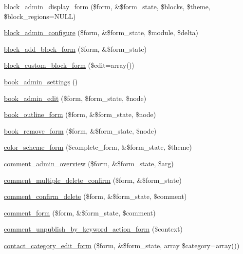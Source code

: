 \begin{DoxyCompactItemize}
\hyperlink{group__forms_ga19dc9d98e83e7e7c9574298100752ba7}{block\_\-admin\_\-display\_\-form} (\$form, \&\$form\_\-state, \$blocks, \$theme, \$block\_\-regions=NULL)
\item 
\hyperlink{group__forms_ga0efaf6e043d69e3fe4f596341f6f90e2}{block\_\-admin\_\-configure} (\$form, \&\$form\_\-state, \$module, \$delta)
\item 
\hyperlink{group__forms_ga974d0d9820f12e9a2ce5ae328d0ccdc5}{block\_\-add\_\-block\_\-form} (\$form, \&\$form\_\-state)
\item 
\hyperlink{group__forms_ga94f8fff63b59438120a7269f00dad174}{block\_\-custom\_\-block\_\-form} (\$edit=array())
\item 
\hyperlink{group__forms_ga036f1d2ed17d79b71545c955c864cf2e}{book\_\-admin\_\-settings} ()
\item 
\hyperlink{group__forms_gac3a5a2ff41875baa73d6af357cf328e6}{book\_\-admin\_\-edit} (\$form, \$form\_\-state, \$node)
\item 
\hyperlink{group__forms_ga4903d29a89909f072c1aab2f8d718bdb}{book\_\-outline\_\-form} (\$form, \&\$form\_\-state, \$node)
\item 
\hyperlink{group__forms_gab7e8aa290196982f23b50a984e215805}{book\_\-remove\_\-form} (\$form, \&\$form\_\-state, \$node)
\item 
\hyperlink{group__forms_ga96d9b56f10f5a4d4178d43444732fb09}{color\_\-scheme\_\-form} (\$complete\_\-form, \&\$form\_\-state, \$theme)
\item 
\hyperlink{group__forms_ga73d86cbdbe6e2e14ca63fa234e9789b3}{comment\_\-admin\_\-overview} (\$form, \&\$form\_\-state, \$arg)
\item 
\hyperlink{group__forms_ga9c94271c79747235e0914e4f0ee9be8e}{comment\_\-multiple\_\-delete\_\-confirm} (\$form, \&\$form\_\-state)
\item 
\hyperlink{group__forms_gae661cbb8f0f988f538980296a6f062c8}{comment\_\-confirm\_\-delete} (\$form, \&\$form\_\-state, \$comment)
\item 
\hyperlink{group__forms_ga86e714d86cac517f85b3cadf42ba2977}{comment\_\-form} (\$form, \&\$form\_\-state, \$comment)
\item 
\hyperlink{group__forms_gad0012e675df965329fce2570a6be8f46}{comment\_\-unpublish\_\-by\_\-keyword\_\-action\_\-form} (\$context)
\item 
\hyperlink{group__forms_ga9283549b12df4a9a6cdb49202ae658ac}{contact\_\-category\_\-edit\_\-form} (\$form, \&\$form\_\-state, array \$category=array())
\item 

\end{DoxyCompactItemize}
